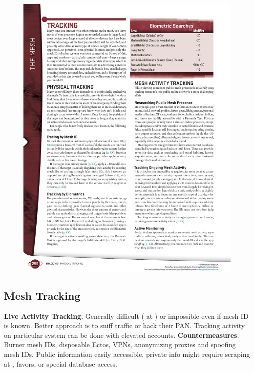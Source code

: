\begin{figure}[htbp!]%
   \includegraphics[scale=1.0]{gfx/mesh-search-biometric}%
\end{figure}%

\subsection*{Mesh Tracking}

\begin{itemize}
   \itembox \textbf{Live Activity Tracking}. Generally difficult ( at ) or impossible even if mesh ID is known. Better approach is to sniff traffic or hack their PAN. Tracking activity on particular system can be done with elevated accounts.
   \itembox \textbf{Countermeasures}. Burner mesh IDs, disposable Ectos, VPNs, anonymizing proxies and spoofing mesh IDs.
   \itembox Public information easily accessible, private info might require  scraping at , favors, or special database access.
\end{itemize}


